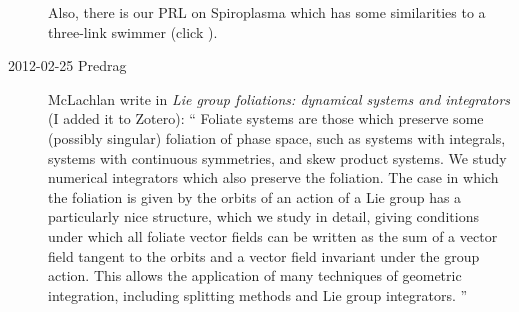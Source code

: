\begin{description}
Also, there is our PRL on Spiroplasma which has some
similarities to a three-link swimmer (click
).

\item[2012-02-25 Predrag]
{McLachlan} \etal{} write in
{\em Lie group foliations: dynamical systems and integrators}
(I added it to Zotero): ``
Foliate systems are those which preserve some (possibly
singular) foliation of phase space, such as systems with integrals,
systems with continuous symmetries, and skew product systems. We study
numerical integrators which also preserve the foliation. The case in
which the foliation is given by the orbits of an action of a Lie group
has a particularly nice structure, which we study in detail, giving
conditions under which all foliate vector fields can be written as the
sum of a vector field tangent to the orbits and a vector field invariant
under the group action. This allows the application of many techniques of
geometric integration, including splitting methods and Lie group
integrators.
''

\end{description}
